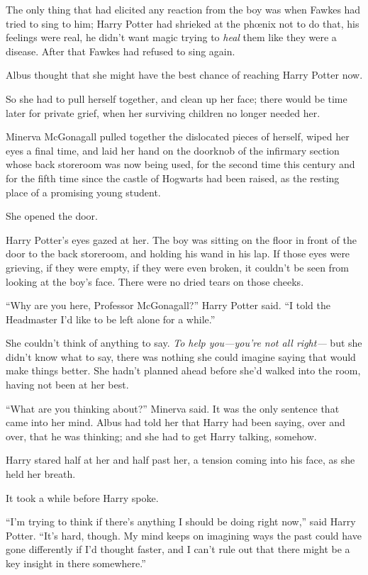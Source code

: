 The only thing that had elicited any reaction from the boy was when Fawkes had tried to sing to him; Harry Potter had shrieked at the phœnix not to do that, his feelings were real, he didn’t want magic trying to \emph{heal} them like they were a disease. After that Fawkes had refused to sing again.

Albus thought that she might have the best chance of reaching Harry Potter now.

So she had to pull herself together, and clean up her face; there would be time later for private grief, when her surviving children no longer needed her.

Minerva McGonagall pulled together the dislocated pieces of herself, wiped her eyes a final time, and laid her hand on the doorknob of the infirmary section whose back storeroom was now being used, for the second time this century and for the fifth time since the castle of Hogwarts had been raised, as the resting place of a promising young student.

She opened the door.

Harry Potter’s eyes gazed at her. The boy was sitting on the floor in front of the door to the back storeroom, and holding his wand in his lap. If those eyes were grieving, if they were empty, if they were even broken, it couldn’t be seen from looking at the boy’s face. There were no dried tears on those cheeks.

“Why are you here, Professor McGonagall?” Harry Potter said.
“I told the Headmaster I’d like to be left alone for a while.”

She couldn’t think of anything to say. \emph{To help you—you’re not all right—} but she didn’t know what to say, there was nothing she could imagine saying that would make things better. She hadn’t planned ahead before she’d walked into the room, having not been at her best.

“What are you thinking about?” Minerva said. It was the only sentence that came into her mind. Albus had told her that Harry had been saying, over and over, that he was thinking; and she had to get Harry talking, somehow.

Harry stared half at her and half past her, a tension coming into his face, as she held her breath.

It took a while before Harry spoke.

“I’m trying to think if there’s anything I should be doing right now,” said Harry Potter.
“It’s hard, though. My mind keeps on imagining ways the past could have gone differently if I’d thought faster, and I can’t rule out that there might be a key insight in there somewhere.”

